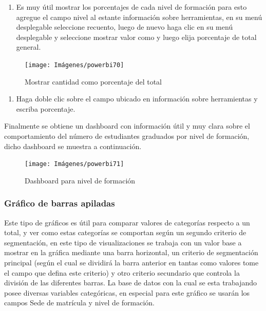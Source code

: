 \documentclass[
]{book}
\providecommand{\tightlist}{%
  \setlength{\itemsep}{0pt}\setlength{\parskip}{0pt}}
\begin{document}
\begin{enumerate}
\def\labelenumi{\arabic{enumi}.}
\setcounter{enumi}{6}
\tightlist
\item
  Es muy útil mostrar los porcentajes de cada nivel de formación para esto agregue el campo nivel al estante información sobre herramientas, en su menú desplegable seleccione recuento, luego de nuevo haga clic en su menú desplegable y seleccione mostrar valor como y luego elija porcentaje de total general.
\end{enumerate}

\begin{figure}

{\centering \texttt{[image: Imágenes/powerbi70]} 

}

\caption{Mostrar cantidad como porcentaje del total}\label{fig:paso7barras-fig}
\end{figure}

\begin{enumerate}
\def\labelenumi{\arabic{enumi}.}
\setcounter{enumi}{7}
\tightlist
\item
  Haga doble clic sobre el campo ubicado en información sobre herramientas y escriba porcentaje.
\end{enumerate}

Finalmente se obtiene un dashboard con información útil y muy clara sobre el comportamiento del número de estudiantes graduados por nivel de formación, dicho dashboard se muestra a continuación.

\begin{figure}

{\centering \texttt{[image: Imágenes/powerbi71]} 

}

\caption{Dashboard para nivel de formación}\label{fig:tableronivelformacion-fig}
\end{figure}

\hypertarget{barrasapiladas}{%
\subsubsection{Gráfico de barras apiladas}\label{barrasapiladas}}

Este tipo de gráficos es útil para comparar valores de categorías respecto a un total, y ver como estas categorías se comportan según un segundo criterio de segmentación, en este tipo de visualizaciones se trabaja con un valor base a mostrar en la gráfica mediante una barra horizontal, un criterio de segmentación principal (según el cual se dividirá la barra anterior en tantas como valores tome el campo que defina este criterio) y otro criterio secundario que controla la división de las diferentes barras.
La base de datos con la cual se esta trabajando posee diversas variables categóricas, en especial para este gráfico se usarán los campos Sede de matrícula y nivel de formación.
\end{document}
